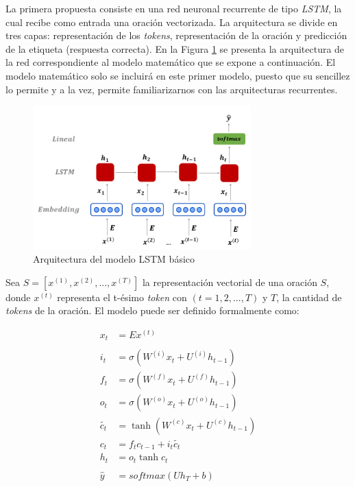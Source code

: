 La primera propuesta consiste en una red neuronal recurrente de tipo \textit{LSTM}, la cual recibe como entrada una oración vectorizada. La arquitectura se divide en tres capas: representación de los \textit{tokens}, representación de la oración y predicción de la etiqueta (respuesta correcta). En la Figura \ref{lstm} se presenta la arquitectura de la red correspondiente al modelo matemático que se expone a continuación. El modelo matemático solo se incluirá en este primer modelo, puesto que su sencillez lo permite y a la vez, permite familiarizarnos con las arquitecturas recurrentes. 

\begin{figure}[!tb]
  \begin{center}    
    \includegraphics[angle=0, width=0.75\textwidth]{Graphics/lstm2.png} 
  \end{center}
    \caption{Arquitectura del modelo LSTM básico}\label{lstm}
\end{figure}

Sea $S = [x^{(1)}, x^{(2)}, ..., x^{(T)}]$ la representación vectorial de una oración $S$, donde $x^{(t)}$ representa el t-ésimo \textit{token} con $(t = 1, 2, ..., T)$ y $T$, la cantidad de \textit{tokens} de la oración. El modelo puede ser definido formalmente como:

\begin{align}
  x_{t} &= Ex^{(t)} \label{lstm:emb} \\
  \nonumber \\
  i_{t} &= \sigma{(W^{(i)} x_{t} + U^{(i)}h_{t-1})} \label{lstm:ig} \\
  f_{t} &= \sigma{(W^{(f)} x_{t} + U^{(f)}h_{t-1})} \label{lstm:fg} \\
  o_{t} &= \sigma{(W^{(o)} x_{t} + U^{(o)}h_{t-1})} \label{lstm:og} \\
  \tilde{c_{t}} &= \tanh(W^{(c)} x_{t} + U^{(c)}h_{t-1}) \label{lstm:new_memory_generation} \\
  c_{t} &= f_{t}c_{t-1} + i_{t}\tilde{c_{t}} \label{lstm:cell_state} \\
  h_{t} &= o_{t}\tanh{c_{t}} \label{lstm:hidden_state} \\
  \nonumber \\
  \hat{y} &= softmax(Uh_{T} + b) \label{lstm:pred}
\end{align}

